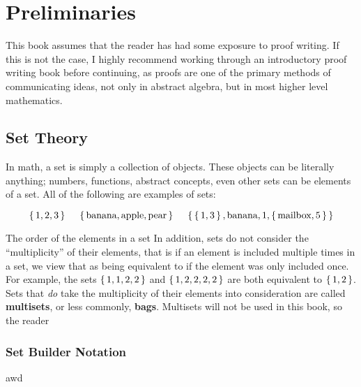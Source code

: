 \chapter{Preliminaries}

This book assumes that the reader has had some exposure to proof writing. If
this is not the case, I highly recommend working through an introductory proof
writing book before continuing, as proofs are one of the primary methods of
communicating ideas, not only in abstract algebra, but in most higher level
mathematics.

\section*{Set Theory}

In math, a set is simply a collection of objects. These objects can be
literally anything; numbers, functions, abstract concepts, even other sets can
be elements of a set. All of the following are examples of sets:

\[
    \braces{1, 2, 3}
    \ \ \ \ 
    \braces{\text{banana}, \text{apple}, \text{pear}}
    \ \ \ \ 
    \braces{ \braces{1, 3}, \text{banana}, 1, \braces{\text{mailbox}, 5}}
\]

The order of the elements in a set
In addition, sets do not consider the ``multiplicity'' of
their elements, that is if an element is included multiple times in a set, we
view that as being equivalent to if the element was only included once. For
example, the sets \( \left\{ \, 1, 1, 2, 2 \, \right\} \) and \( \left\{ \, 1, 2, 2, 2, 2 \, \right\} \)
are both equivalent to \( \left\{ \, 1, 2 \, \right\} \). Sets that \textit{do} take the
multiplicity of their elements into consideration are called
\textbf{multisets}, or less commonly, \textbf{bags}. Multisets will not be used
in this book, so the reader

\subsection*{Set Builder Notation}

awd
